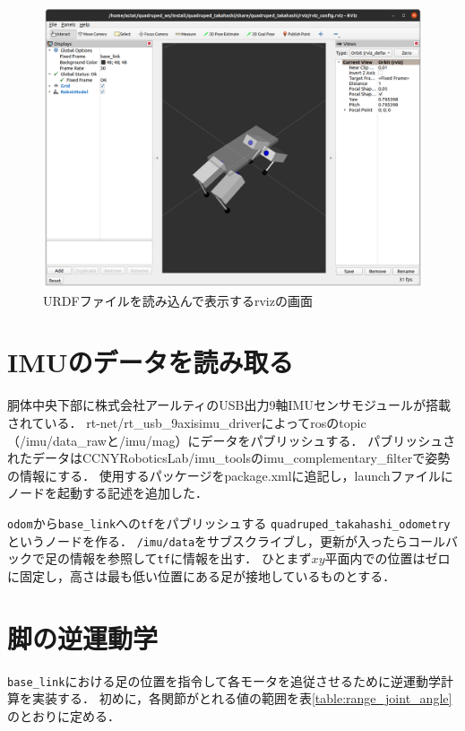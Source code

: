 \documentclass[a4paper]{jlreq}
\begin{document}
  \begin{figure}[htb]
    \centering
    \includegraphics[width=15cm]{urdf_rviz_screen.png}
    \caption{URDFファイルを読み込んで表示するrvizの画面}
    \label{fig:urdf_rviz_screen}
  \end{figure}

  \section{IMUのデータを読み取る}

  胴体中央下部に株式会社アールティのUSB出力9軸IMUセンサモジュールが搭載されている．
  rt-net/rt\_usb\_9axisimu\_driverによってrosのtopic（/imu/data\_rawと/imu/mag）にデータをパブリッシュする．
  パブリッシュされたデータはCCNYRoboticsLab/imu\_toolsのimu\_complementary\_filterで姿勢の情報にする．
  使用するパッケージをpackage.xmlに追記し，launchファイルにノードを起動する記述を追加した．

  \texttt{odom}から\texttt{base\_link}への\texttt{tf}をパブリッシュする
  \texttt{quadruped\_takahashi\_odometry}というノードを作る．
  \texttt{/imu/data}をサブスクライブし，更新が入ったらコールバックで足の情報を参照して\texttt{tf}に情報を出す．
  ひとまず$xy$平面内での位置はゼロに固定し，高さは最も低い位置にある足が接地しているものとする．

  \section{脚の逆運動学}

  \texttt{base\_link}における足の位置を指令して各モータを追従させるために逆運動学計算を実装する．
  初めに，各関節がとれる値の範囲を表\ref{table:range_joint_angle}のとおりに定める．
\end{document}

